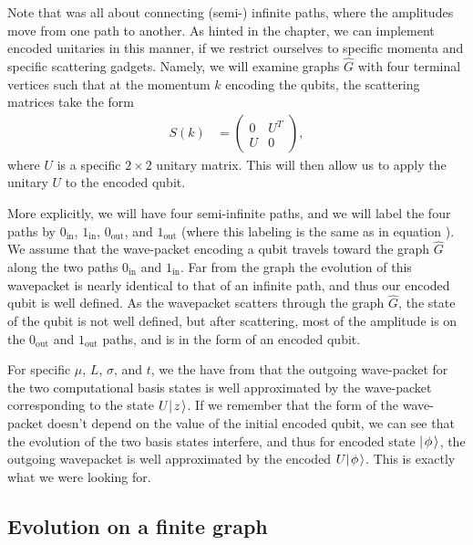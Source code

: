\documentclass[../thesis-main/thesis-main]{subfiles}
\begin{document}
Note that  was all about connecting (semi-) infinite paths, where the amplitudes move from one path to another.  As hinted in the chapter, we can implement encoded unitaries in this manner, if we restrict ourselves to specific momenta and specific scattering gadgets.  Namely, we will examine graphs $\widehat{G}$ with four terminal vertices such that at the momentum $k$ encoding the qubits, the scattering matrices take the form
\begin{align}
  S(k) &= \begin{pmatrix} 0 & U^{T} \\
  U & 0\end{pmatrix},
  \label{eq:unitary_s_matrix}
\end{align}
where $U$ is a specific $2\times 2$ unitary matrix.  This will then allow us to apply the unitary $U$ to the encoded qubit.

More explicitly, we will have four semi-infinite paths, and we will label the four paths by $0_{\text{in}}$, $1_{\text{in}}$, $0_{\text{out}}$, and $1_{\text{out}}$ (where this labeling is the same as in equation ).  We assume that the wave-packet encoding a qubit travels toward the graph $\widehat{G}$ along the two paths $0_{\text{in}}$ and $1_{\text{in}}$.  Far from the graph the evolution of this wavepacket is nearly identical to that of an infinite path, and thus our encoded qubit is well defined.  As the wavepacket scatters through the graph $\widehat{G}$, the state of the qubit is not well defined, but after scattering, most of the amplitude is on the $0_{\text{out}}$ and $1_{\text{out}}$ paths, and is in the form of an encoded qubit. 

For specific $\mu$, $L$, $\sigma$, and $t$, we the have from  that the outgoing wave-packet for the two computational basis states is well approximated by the wave-packet corresponding to the state $U |\mspace{2mu} z \mspace{2mu} \rangle$.  If we remember that the form of the wave-packet doesn't depend on the value of the initial encoded qubit, we can see that the evolution of the two basis states interfere, and thus for  encoded state $|\mspace{2mu} \phi \mspace{2mu} \rangle$, the outgoing wavepacket is well approximated by the encoded $U|\mspace{2mu} \phi \mspace{2mu} \rangle$.  This is exactly what we were looking for.





\subsection{Evolution on a finite graph}\label{sec:single_qubit_finite_graph}
\end{document}
